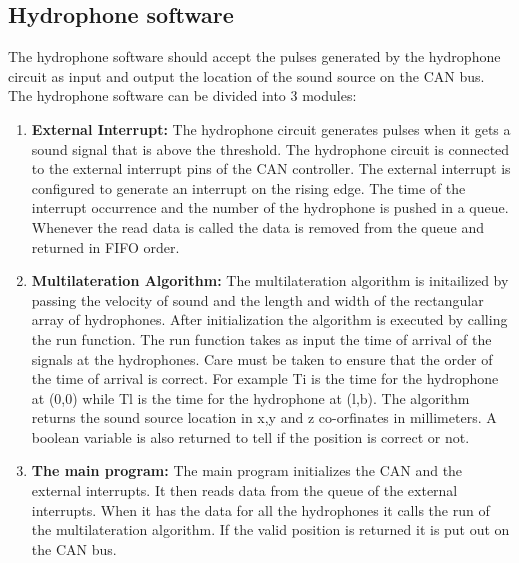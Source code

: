 
\subsection{Hydrophone software}
The hydrophone software should accept the pulses generated by the hydrophone circuit as input and output the location of the sound source on the CAN bus. The hydrophone software can be divided into 3 modules:
\begin{enumerate}
\item \textbf{External Interrupt:} The hydrophone circuit generates pulses when it gets a sound signal that is above the threshold. The hydrophone circuit is connected to the external interrupt pins of the CAN controller. The external interrupt is configured to generate an interrupt on the rising edge. The time of the interrupt occurrence and the number of the hydrophone is pushed in a queue. Whenever the read data is called the data is removed from the queue and returned in FIFO order.
\item \textbf{Multilateration Algorithm:} The multilateration algorithm is initailized by passing the velocity of sound and the length and width of the rectangular array of hydrophones. After initialization the algorithm is executed by calling the run function. The run function takes as input the time of arrival of the signals at the hydrophones. Care must be taken to ensure that the order of the time of arrival is correct. For example Ti is the time for the hydrophone at (0,0) while Tl is the time for the hydrophone at (l,b). The algorithm returns the sound source location in x,y and z co-orfinates in millimeters. A boolean variable is also returned to tell if the position is correct or not.
\item \textbf{The main program:} The main program initializes the CAN and the external interrupts. It then reads data from the queue of the external interrupts. When it has the data for all the hydrophones it calls the run of the multilateration algorithm. If the valid position is returned it is put out on the CAN bus.
\end{enumerate}

